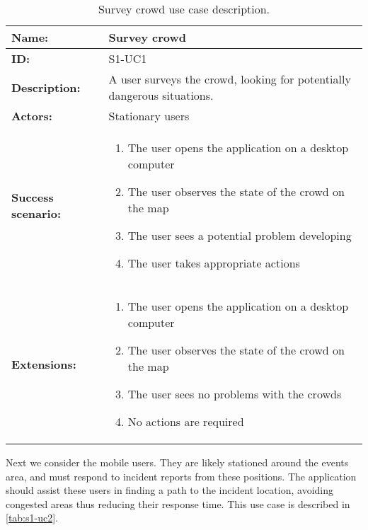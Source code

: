 \begin{table}[h!]
    \centering
    \begin{tabularx}{\textwidth}{|l|X|}
        \hline
        \textbf{Name:}  & Survey crowd \\ \hline
        \textbf{ID:}    & S1-UC1 \\ \hline
        \textbf{Description:} & A user surveys the crowd, looking for potentially dangerous situations. \\ \hline
        \textbf{Actors:} & Stationary users \\ \hline
        \textbf{Success scenario:} & 
        \begin{enumerate}
            \item The user opens the application on a desktop computer
            \item The user observes the state of the crowd on the map
            \item The user sees a potential problem developing
            \item The user takes appropriate actions
        \end{enumerate}
        \\ \hline
        \textbf{Extensions:} &
        \begin{enumerate}[label=*\arabic A]
            \item The user opens the application on a desktop computer
            \item The user observes the state of the crowd on the map
            \item The user sees no problems with the crowds
            \item No actions are required
        \end{enumerate} 
        \\ \hline
    \end{tabularx}
    \caption{Survey crowd use case description.}
    \label{tab:s1-uc1}
\end{table}

Next we consider the mobile users. They are likely stationed around the events area, and must respond to incident reports from these positions. The application should assist these users in finding a path to the incident location, avoiding congested areas thus reducing their response time. This use case is described in \cref{tab:s1-uc2}.

